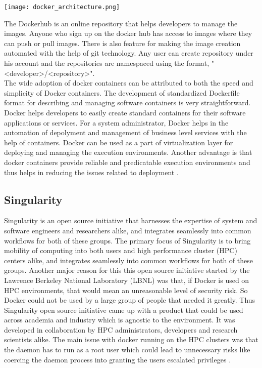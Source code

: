 \begin{center}
\texttt{[image: docker\_architecture.png]}
\label{fig:docker_architecture}
\end{center}

The Dockerhub is an online repository that helps developers to manage the images. Anyone who sign up on the docker hub has access to images where they can push or pull images. There is also feature for making the image creation automated with the help of git technology. Any user can create repository under his account and the repositories are namespaced using the format, "\textless developer\textgreater/\textless repository\textgreater"\cite{7742298}.\\

The wide adoption of docker containers can be attributed to both the speed and simplicity of Docker containers. The development of standardized Dockerfile format for describing and managing software containers is very straightforward. Docker helps developers to easily create standard containers for their software applications or services. For a system administrator, Docker helps in the automation of depolyment and management of business level services with the help of containers. Docker can be used as a part of virtualization layer for deploying and managing the execution environments. Another advantage is that docker containers provide reliable and predicatable execution environments and thus helps in reducing the issues related to deployment \cite{DBLP:journals/corr/MorrisVHM17}.

 
 
\subsection{Singularity}
Singularity is an open source initiative that harnesses the expertise of system and software engineers and researchers alike, and integrates seamlessly into common workflows for both of these groups. The primary focus of Singularity is to bring mobility of computing into both users and high performance cluster (HPC) centers alike, and integrates seamlessly into common workflows for both of these groups. Another major reason for this this open source initiative started by the Lawrence Berkeley National Laboratory (LBNL) was that, if Docker is used on HPC environments, that would mean an unreasonable level of security risk. So Docker could not be used by a large group of people that needed it greatly. Thus Singularity open source initiative came up with a product that could be used across academia and industry which is agnostic to the environment. It was developed in collaboration by HPC administrators, developers and research scientists alike. The main issue with docker running on the HPC clusters was that the daemon has to run as a root user which could lead to unnecessary risks like coercing the daemon process into granting the users escalated privileges \cite{10.1371/journal.pone.0177459}.\\


